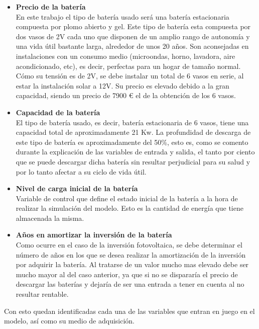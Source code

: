 \begin{itemize}
	\item \textbf{Precio de la batería}\\ En este trabajo el tipo de batería usado será una batería estacionaria compuesta por plomo abierto y gel. Este tipo de batería esta compuesta por dos vasos de 2V cada uno que disponen de un amplio rango de autonomía y una vida útil bastante larga, alrededor de unos 20 años. Son aconsejadas en instalaciones con un consumo medio (microondas, horno, lavadora, aire acondicionado, etc), es decir, perfectas para un hogar de tamaño normal. Cómo su tensión es de 2V, se debe instalar un total de 6 vasos en serie, al estar la instalación solar a 12V. Su precio es elevado debido a la gran capacidad, siendo un precio de 7900 € el de la obtención de los 6 vasos.
	\item \textbf{Capacidad de la batería}\\ El tipo de batería usado, es decir, batería estacionaria de 6 vasos, tiene una capacidad total de aproximadamente 21 Kw. La profundidad de descarga de este tipo de batería es aproximadamente del 50\%, esto es, como se comento durante la explicación de las variables de entrada y salida, el tanto por ciento que se puede descargar dicha batería sin resultar perjudicial para su salud y por lo tanto afectar a su ciclo de vida útil.
	\item \textbf{Nivel de carga inicial de la batería}\\ Variable de control que define el estado inicial de la batería a la hora de realizar la simulación del modelo. Esto es la cantidad de energía que tiene almacenada la misma.
	\item \textbf{Años en amortizar la inversión de la batería}\\ Como ocurre en el caso de la inversión fotovoltaica, se debe determinar el número de años en los que se desea realizar la amortización de la inversión por adquirir la batería. Al tratarse de un valor mucho mas elevado debe ser mucho mayor al del caso anterior, ya que si no se dispararía el precio de descargar las baterías y dejaría de ser una entrada a tener en cuenta al no resultar rentable.
\end{itemize}
Con esto quedan identificadas cada una de las variables que entran en juego en el modelo, así como su medio de adquisición.
